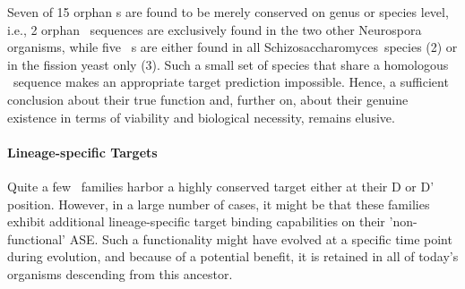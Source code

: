 Seven of 15 orphan \haca s are found to be merely conserved on genus
or species level, i.e., 2 orphan \ncr\ sequences are exclusively found
in the two other Neurospora organisms, while five \spo\ \sno s are
either found in all Schizosaccharomyces\ species (2) or in the fission
yeast only (3). Such a small set of species that share a homologous
\sno\ sequence makes an appropriate target prediction
impossible. Hence, a sufficient conclusion about their true function
and, further on, about their genuine existence in terms of viability
and biological necessity, remains elusive.

\paragraph{\textbf{Lineage-specific Targets}}
Quite a few \cd\ families harbor a highly conserved target either at
their D or D' position. However, in a large number of cases, it might
be that these families exhibit additional lineage-specific target
binding capabilities on their 'non-functional' ASE. Such a
functionality might have evolved at a specific time point during
evolution, and because of a potential benefit, it is retained in all of
today's organisms descending from this ancestor.

